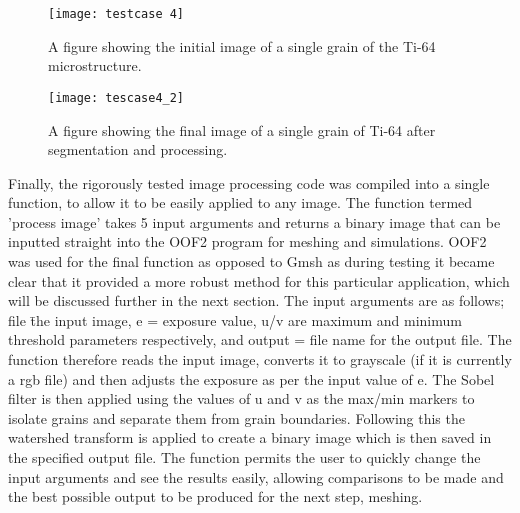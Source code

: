\documentclass[\report.tex]{subfiles}
\begin{document}
\begin{figure}
\centering
\parbox{5cm}{
\texttt{[image: testcase 4]}
\caption{A figure showing the initial image of a single grain of the Ti-64 microstructure.}
\label{fig:2figsA}}
\qquad
\begin{minipage}{6cm}
\texttt{[image: tescase4\_2]}
\caption{A figure showing the final image of a single grain of Ti-64 after segmentation and processing.}
\label{fig:2figsB}
\end{minipage}
\end{figure}

\noindent Finally, the rigorously tested image processing code was compiled into a single function, to allow it to be easily applied to any image. The function termed 'process image' takes 5 input arguments and returns a binary image that can be inputted straight into the OOF2 program for meshing and simulations. OOF2 was used for the final function as opposed to Gmsh as during testing it became clear that it provided a more robust method for this particular application, which will be discussed further in the next section. The input arguments are as follows; file \= the input image, e = exposure value, u/v are maximum and minimum threshold parameters respectively, and output = file name for the output file. The function therefore reads the input image, converts it to grayscale (if it is currently a rgb file) and then adjusts the exposure as per the input value of e. The Sobel filter is then applied using the values of u and v as the max/min markers to isolate grains and separate them from grain boundaries. Following this the watershed transform is applied to create a binary image which is then saved in the specified output file. The function permits the user to quickly change the input arguments and see the results easily, allowing comparisons to be made and the best possible output to be produced for the next step, meshing.
\end{document}

